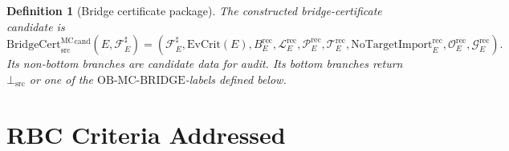 \documentclass[11pt]{article}
\newcommand{\BridgeCert}{\mathrm{BridgeCert}_{\mathrm{src}}^{\mathrm{MC}}}
\newcommand{\EvCrit}{\mathrm{EvCrit}}
\newcommand{\BottomSrc}{\bot_{\mathrm{src}}}
\newcommand{\NoTargetImport}{\mathrm{NoTargetImport}}
\newcommand{\OBMCB}{\mathrm{OB}\mbox{-}\mathrm{MC}\mbox{-}\mathrm{BRIDGE}}
\newtheorem{definition}{Definition}
\begin{document}
\begin{definition}[Bridge certificate package]
The constructed bridge-certificate candidate is
\[
  \BridgeCert^{\mathrm{cand}}(E,\mathcal{F}_E^\sharp)
  =
  (\mathcal{F}_E^\sharp,\EvCrit(E),B_E^{\mathrm{rec}},
  \mathcal{L}_E^{\mathrm{rec}},\mathcal{P}_E^{\mathrm{rec}},
  \mathcal{T}_E^{\mathrm{rec}},\NoTargetImport_E^{\mathrm{rec}},
  \mathcal{O}_E^{\mathrm{rec}},\mathcal{G}_E^{\mathrm{rec}}).
\]
Its non-bottom branches are candidate data for audit. Its bottom branches
return \(\BottomSrc\) or one of the \(\OBMCB\)-labels defined below.
\end{definition}

\section{RBC Criteria Addressed}
\end{document}
